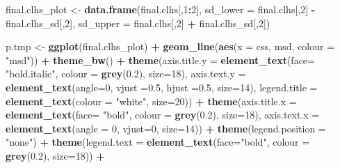 \documentclass[]{book}
\newenvironment{Shaded}{\begin{snugshade}}{\end{snugshade}}
\newcommand{\DataTypeTok}[1]{\textcolor[rgb]{0.13,0.29,0.53}{#1}}
\newcommand{\DecValTok}[1]{\textcolor[rgb]{0.00,0.00,0.81}{#1}}
\newcommand{\FloatTok}[1]{\textcolor[rgb]{0.00,0.00,0.81}{#1}}
\newcommand{\KeywordTok}[1]{\textcolor[rgb]{0.13,0.29,0.53}{\textbf{#1}}}
\newcommand{\NormalTok}[1]{#1}
\newcommand{\OperatorTok}[1]{\textcolor[rgb]{0.81,0.36,0.00}{\textbf{#1}}}
\newcommand{\StringTok}[1]{\textcolor[rgb]{0.31,0.60,0.02}{#1}}
\begin{document}
\begin{Shaded}
\begin{Highlighting}[]
\NormalTok{final.clhs_plot <-}\StringTok{ }\KeywordTok{data.frame}\NormalTok{(final.clhs[,}\DecValTok{1}\OperatorTok{:}\DecValTok{2}\NormalTok{], }
                              \DataTypeTok{sd_lower =}\NormalTok{ final.clhs[,}\DecValTok{2}\NormalTok{] }\OperatorTok{-}\StringTok{ }\NormalTok{final.clhs_sd[,}\DecValTok{2}\NormalTok{],}
                              \DataTypeTok{sd_upper =}\NormalTok{ final.clhs[,}\DecValTok{2}\NormalTok{] }\OperatorTok{+}\StringTok{ }\NormalTok{final.clhs_sd[,}\DecValTok{2}\NormalTok{])}

\NormalTok{p.tmp <-}\StringTok{ }\KeywordTok{ggplot}\NormalTok{(final.clhs_plot) }\OperatorTok{+}\StringTok{ }\KeywordTok{geom_line}\NormalTok{(}\KeywordTok{aes}\NormalTok{(}\DataTypeTok{x =}\NormalTok{ css, msd, }\DataTypeTok{colour =} \StringTok{"msd"}\NormalTok{)) }\OperatorTok{+}\StringTok{ }
\StringTok{  }\KeywordTok{theme_bw}\NormalTok{() }\OperatorTok{+}\StringTok{ }
\StringTok{  }\KeywordTok{theme}\NormalTok{(}\DataTypeTok{axis.title.y =} \KeywordTok{element_text}\NormalTok{(}\DataTypeTok{face=} \StringTok{"bold.italic"}\NormalTok{, }\DataTypeTok{colour =} \KeywordTok{grey}\NormalTok{(}\FloatTok{0.2}\NormalTok{), }\DataTypeTok{size=}\DecValTok{18}\NormalTok{),}
        \DataTypeTok{axis.text.y  =} \KeywordTok{element_text}\NormalTok{(}\DataTypeTok{angle=}\DecValTok{0}\NormalTok{, }\DataTypeTok{vjust =}\FloatTok{0.5}\NormalTok{, }\DataTypeTok{hjust =}\FloatTok{0.5}\NormalTok{, }\DataTypeTok{size=}\DecValTok{14}\NormalTok{), }
        \DataTypeTok{legend.title =} \KeywordTok{element_text}\NormalTok{(}\DataTypeTok{colour =} \StringTok{"white"}\NormalTok{, }\DataTypeTok{size=}\DecValTok{20}\NormalTok{)) }\OperatorTok{+}
\StringTok{  }\KeywordTok{theme}\NormalTok{(}\DataTypeTok{axis.title.x =} \KeywordTok{element_text}\NormalTok{(}\DataTypeTok{face=} \StringTok{"bold"}\NormalTok{, }\DataTypeTok{colour =} \KeywordTok{grey}\NormalTok{(}\FloatTok{0.2}\NormalTok{), }\DataTypeTok{size=}\DecValTok{18}\NormalTok{),}
        \DataTypeTok{axis.text.x  =} \KeywordTok{element_text}\NormalTok{(}\DataTypeTok{angle =} \DecValTok{0}\NormalTok{, }\DataTypeTok{vjust=}\DecValTok{0}\NormalTok{, }\DataTypeTok{size=}\DecValTok{14}\NormalTok{)) }\OperatorTok{+}
\StringTok{  }\KeywordTok{theme}\NormalTok{(}\DataTypeTok{legend.position =} \StringTok{"none"}\NormalTok{) }\OperatorTok{+}\StringTok{ }
\StringTok{  }\KeywordTok{theme}\NormalTok{(}\DataTypeTok{legend.text =} \KeywordTok{element_text}\NormalTok{(}\DataTypeTok{face=}\StringTok{"bold"}\NormalTok{, }\DataTypeTok{colour =} \KeywordTok{grey}\NormalTok{(}\FloatTok{0.2}\NormalTok{), }\DataTypeTok{size=}\DecValTok{18}\NormalTok{)) }\OperatorTok{+}

\end{Highlighting}
\end{Shaded}
\end{document}

